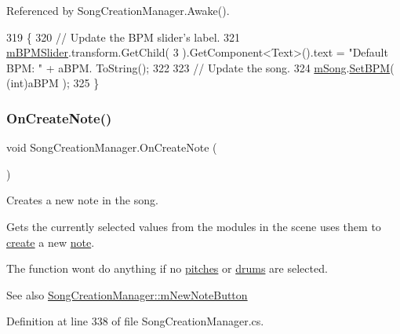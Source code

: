Referenced by Song\+Creation\+Manager.\+Awake().


\begin{DoxyCode}
319     \{
320         \textcolor{comment}{// Update the BPM slider's label.}
321         \hyperlink{group___s_c_m_priv_var_ga87ac3691ad7848394e51442f29d9659d}{mBPMSlider}.transform.GetChild( 3 ).GetComponent<Text>().text = \textcolor{stringliteral}{"Default BPM: "} + aBPM.
      ToString();
322 
323         \textcolor{comment}{// Update the song.}
324         \hyperlink{group___s_c_m_priv_var_gabd8329149faef65a689650d951a9abc9}{mSong}.\hyperlink{group___song_pub_func_gaa65bbba1af7192edff7e0f848029013b}{SetBPM}( (\textcolor{keywordtype}{int})aBPM );
325     \}
\end{DoxyCode}
\mbox{\label{group___s_c_m_handlers_gaed512eb78e060a40616e6e31ce029440}} 
\subsubsection{\texorpdfstring{On\+Create\+Note()}{OnCreateNote()}}
{\footnotesize\ttfamily void Song\+Creation\+Manager.\+On\+Create\+Note (\begin{DoxyParamCaption}{ }\end{DoxyParamCaption})}



Creates a new note in the song. 

Gets the currently selected values from the modules in the scene uses them to \hyperlink{group___music_stat_func_gaaf74885e43eb623f64f961985fadcd08}{create} a new \hyperlink{group___music_structs_struct_music_1_1_combined_note}{note}.

The function won\textquotesingle{}t do anything if no \hyperlink{group___s_c_m_priv_var_gab84821120cace4099edfb42c52d2af63}{pitches} or \hyperlink{group___s_c_m_priv_var_gac8be873b8259a0ddf76b4fa6d7d2d072}{drums} are selected.

\begin{DoxySeeAlso}{See also}
\hyperlink{group___s_c_m_priv_var_gac17f83788e480bb97160d17bbe69aab3}{Song\+Creation\+Manager\+::m\+New\+Note\+Button} 
\end{DoxySeeAlso}


Definition at line 338 of file Song\+Creation\+Manager.\+cs.



